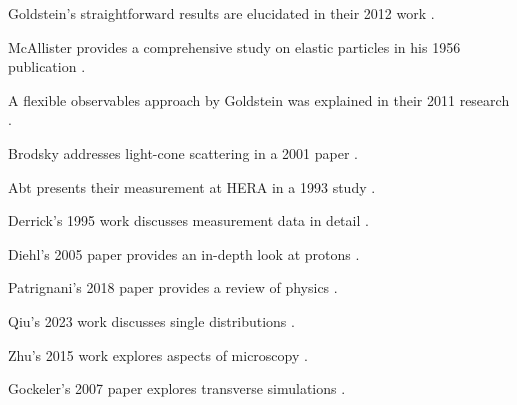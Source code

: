 
Goldstein's straightforward results are elucidated in their 2012 work \cite{Goldstein2012EasyResults}.

McAllister provides a comprehensive study on elastic particles in his 1956 publication \cite{McAllister1956ElasticParticle}.

A flexible observables approach by Goldstein was explained in their 2011 research \cite{Goldstein2011FlexibleObservables}.

Brodsky addresses light-cone scattering in a 2001 paper \cite{Brodsky2001Light-coneScattering}.

Abt presents their measurement at HERA in a 1993 study \cite{Abt1993MeasurementHERA}.

Derrick's 1995 work discusses measurement data in detail \cite{Derrick1995MeasurementData}.

Diehl's 2005 paper provides an in-depth look at protons \cite{Diehl2005OnProtons}.

Patrignani's 2018 paper provides a review of physics \cite{Patrignani2018ReviewPhysics}.

Qiu's 2023 work discusses single distributions \cite{Qiu2023SingleDistributions}.

Zhu's 2015 work explores aspects of microscopy \cite{Zhu2015TheMicroscopy}.

Gockeler's 2007 paper explores transverse simulations \cite{Gockeler2007TransverseSimulations}.



